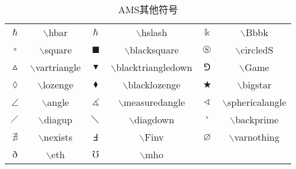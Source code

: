 \documentclass[UTF8]{ctexart}
\begin{document}
\begin{table}[H]
	\begin{center}
		\caption{AMS其他符号}
		\begin{tabular}{cccccc}
			
			$\hbar$  &  $\backslash$hbar  &  $\hslash$  & $\backslash$hslash  &  $\Bbbk$  & $\backslash$Bbbk  \\

			$\square$  &  $\backslash$square  &  $\blacksquare$  & $\backslash$blacksquare  &  $\circledS$   &  $\backslash$circledS  \\

			$\vartriangle$  &  $\backslash$vartriangle  &  $\blacktriangledown$  & $\backslash$blacktriangledown  &  $\Game$   &  $\backslash$Game  \\			

			$\lozenge$  &  $\backslash$lozenge  &  $\blacklozenge$  & $\backslash$blacklozenge  &  $\bigstar$  & $\backslash$bigstar  \\

			$\angle$  &  $\backslash$angle  &  $\measuredangle$  & $\backslash$measuredangle  &  $\sphericalangle$  & $\backslash$sphericalangle  \\

			$\diagup$  &  $\backslash$diagup  &  $\diagdown$  & $\backslash$diagdown  &  $\backprime$  & $\backslash$backprime  \\


			$\nexists$  &  $\backslash$nexists  &  $\Finv$  & $\backslash$Finv  &  $\varnothing$  & $\backslash$varnothing  \\

			$\eth$  &  $\backslash$eth  &  $\mho$  & $\backslash$mho \\


		\end{tabular}
	\end{center}
\end{table}
\end{document}
